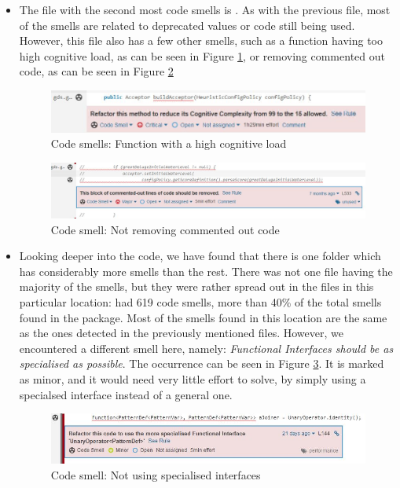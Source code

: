 \begin{itemize}
                \item The file with the second most code smells is 
                . As with the previous file, most of the smells are related to deprecated values or code still being used. However, this file also has a few other smells, such as a function having too high cognitive load, as can be seen in Figure \ref{fig:smells2}, or removing commented out code, as can be seen in Figure \ref{fig:smells1}
                \begin{figure}[H]
                    \centering
                    \includegraphics[scale=1.4]{figures/smell2.JPG}
                    \caption{Code smells: Function with a high cognitive load}
                    \label{fig:smells2}
                \end{figure}
                \begin{figure}[H]
                    \centering
                    \includegraphics[scale=1.2]{figures/smell1.JPG}
                    \caption{Code smell: Not removing commented out code}
                    \label{fig:smells1}
                \end{figure}
                \item Looking deeper into the code, we have found that there is one folder which has considerably more smells than the rest. There was not one file having the majority of the smells, but they were rather spread out in the files in this particular location: 
                 had 619 code smells, more than 40\% of the total smells found in the  package. Most of the smells found in this location are the same as the ones detected in the previously mentioned files. However, we encountered a different smell here, namely: \textit{Functional Interfaces should be as specialised as possible}. The occurrence can be seen in Figure \ref{fig:smell5}. It is marked as minor, and it would need very little effort to solve, by simply using a specialsed interface instead of a general one.
                \begin{figure}[H]
                    \centering
                    \includegraphics[scale=1.5]{figures/smell5.JPG}
                    \caption{Code smell: Not using specialised interfaces}
                    \label{fig:smell5}
                \end{figure}
            \end{itemize}
        
